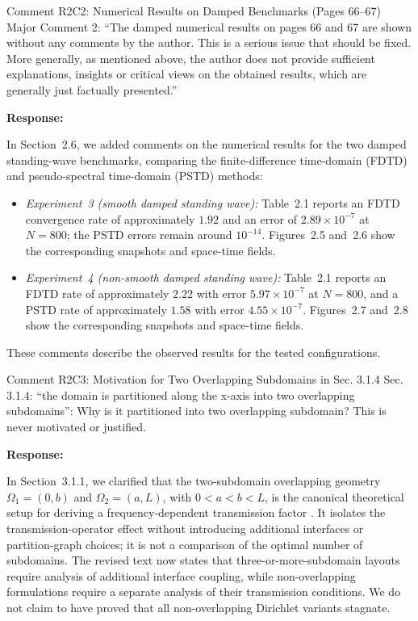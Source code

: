 \documentclass[11pt,a4paper]{article}
\newenvironment{response}{
    \par\vspace{1mm}\noindent\textbf{\textcolor{responseframe}{Response:}}\par\vspace{1mm}
}{
    \par\vspace{3mm}
}
\begin{document}
\begin{revcomment}{Comment R2C2: Numerical Results on Damped Benchmarks (Pages 66--67)}
Major Comment 2: ``The damped numerical results on pages 66 and 67 are shown without any comments by the author. This is a serious issue that should be fixed. More generally, as mentioned above, the author does not provide sufficient explanations, insights or critical views on the obtained results, which are generally just factually presented.''
\end{revcomment}

\begin{response}
In Section~2.6, we added comments on the numerical results for the two damped standing-wave benchmarks, comparing the finite-difference time-domain (FDTD) and pseudo-spectral time-domain (PSTD) methods:
\begin{itemize}
    \item \emph{Experiment~3 (smooth damped standing wave):} Table~2.1 reports an FDTD convergence rate of approximately $1.92$ and an error of $2.89\times10^{-7}$ at $N=800$; the PSTD errors remain around $10^{-14}$. Figures~2.5 and~2.6 show the corresponding snapshots and space-time fields.
    \item \emph{Experiment~4 (non-smooth damped standing wave):} Table~2.1 reports an FDTD rate of approximately $2.22$ with error $5.97\times10^{-7}$ at $N=800$, and a PSTD rate of approximately $1.58$ with error $4.55\times10^{-7}$. Figures~2.7 and~2.8 show the corresponding snapshots and space-time fields.
\end{itemize}
These comments describe the observed results for the tested configurations.
\end{response}

\begin{revcomment}{Comment R2C3: Motivation for Two Overlapping Subdomains in Sec. 3.1.4}
Sec. 3.1.4: ``the domain is partitioned along the x-axis into two overlapping subdomains'': Why is it partitioned into two overlapping subdomain? This is never motivated or justified.
\end{revcomment}

\begin{response}
In Section~3.1.1, we clarified that the two-subdomain overlapping geometry $\Omega_1 = (0, b)$ and $\Omega_2 = (a, L)$, with $0 < a < b < L$, is the canonical theoretical setup for deriving a frequency-dependent transmission factor \citep{gander_optimized_2007,dolean_introduction_2015,quarteroni_domain_1999}. It isolates the transmission-operator effect without introducing additional interfaces or partition-graph choices; it is not a comparison of the optimal number of subdomains. The revised text now states that three-or-more-subdomain layouts require analysis of additional interface coupling, while non-overlapping formulations require a separate analysis of their transmission conditions. We do not claim to have proved that all non-overlapping Dirichlet variants stagnate.
\end{response}
\end{document}
